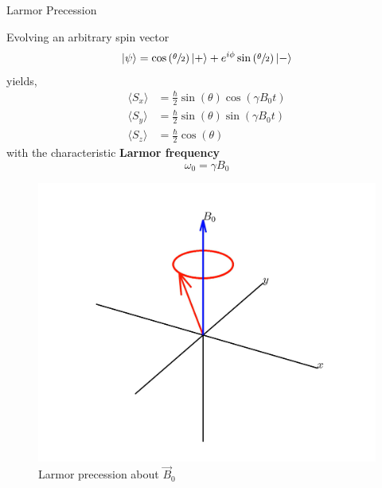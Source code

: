 \documentclass[aspectratio=169,xcolor=dvipsnames]{beamer}
\newcommand{\pauliz}{\begin{pmatrix}
    1 & 0 \\
    0 & -1 
    \end{pmatrix}}
\newcommand{\Bnot}{\vec{B}_0}
\DeclarePairedDelimiter\ket{\lvert}{\rangle}
\begin{document}
\begin{frame}{Larmor Precession}

    \begin{minipage}{0.5\linewidth}
        Evolving an arbitrary spin vector
        \begin{gather*}
            \ket{\psi} = \cos\left(\sfrac{\theta}{2}\right)\ket{+}+ e^{i\phi}\sin\left(\sfrac{\theta}{2}\right) \ket{-}
        \end{gather*}
        yields, \cite{griffiths}
        \begin{align*}
            \langle S_x \rangle &= \frac{\hbar}{2} \sin(\theta)\cos(\gamma B_0 t)\\
            \langle S_y \rangle &= \frac{\hbar}{2} \sin(\theta)\sin(\gamma B_0 t)\\
            \langle S_z \rangle &= \frac{\hbar}{2} \cos(\theta)   
        \end{align*}
        with the characteristic \textbf{Larmor frequency}
        \begin{equation}
            \omega_0 = \gamma B_0 
        \end{equation}
    \end{minipage}
    \hfill
    \begin{minipage}{0.4\linewidth}
        \begin{figure}
            \centering
            \includegraphics[width=\linewidth]{figs/larmor-precession.png}
            \caption{Larmor precession about $\Bnot$}
        \end{figure}
        

\end{minipage}
\end{frame}
\end{document}
